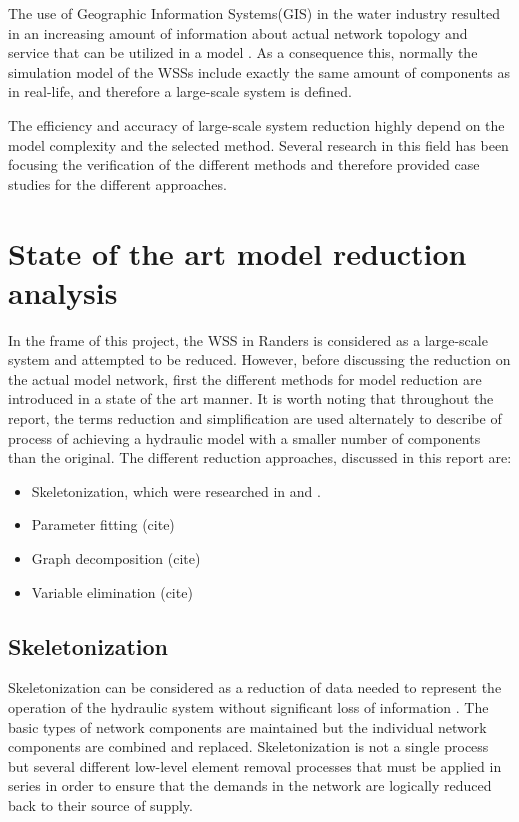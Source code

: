 The use of Geographic Information Systems(GIS) in the water industry resulted in an increasing amount of information about actual network topology and service that can be utilized in a model \cite{johnson2016geographic}. As a consequence this, normally the simulation model of the WSSs include exactly the same amount of components as in real-life, and therefore a large-scale system is defined. 

The efficiency and accuracy of large-scale system reduction highly depend on the model complexity and the selected method. Several research in this field has been focusing the verification of the different methods and therefore provided case studies for the different approaches. 

\section{State of the art model reduction analysis}
\label{state_of_the_art_model_reduction_analysis}

In the frame of this project, the WSS in Randers is considered as a large-scale system and attempted to be reduced. However, before discussing the reduction on the actual model network, first the different methods for model reduction are introduced in a state of the art manner. It is worth noting that throughout the report, the terms reduction and simplification are used alternately to describe of process of achieving a hydraulic model with a smaller number of components than the original. The different reduction approaches, discussed in this report are: 

\begin{itemize}
\item Skeletonization, which were researched in \cite{walski2003advanced} and \cite{battlepaper}.
\item Parameter fitting (cite)
\item Graph decomposition (cite)
\item Variable elimination (cite)
\end{itemize}

\subsection{Skeletonization}
\label{skeletonization}

Skeletonization can be considered as a reduction of data needed to represent the operation of the hydraulic system without significant loss of information \cite{reduction_PHD}. The basic types of network components are maintained but the individual network components are combined and replaced. Skeletonization is not a single process but several different low-level element removal processes that must be applied in series in order to ensure that the demands in the network are logically reduced back to their source of supply. 


